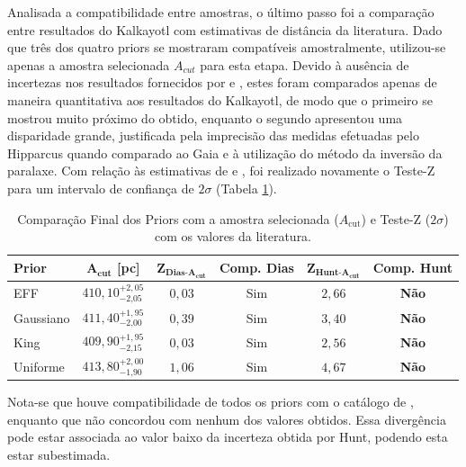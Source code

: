 \documentclass[12pt]{projeto}
\begin{document}
Analisada a compatibilidade entre amostras, o último passo foi a comparação entre resultados do Kalkayotl com estimativas de distância da literatura. Dado que três dos quatro priors se mostraram compatíveis amostralmente, utilizou-se apenas a amostra selecionada \(A_{cut}\) para esta etapa. Devido à ausência de incertezas nos resultados fornecidos por \cite{cantat-gaudin_painting_2020} e \cite{dias_new_2002}, estes foram comparados apenas de maneira quantitativa aos resultados do Kalkayotl, de modo que o primeiro se mostrou muito próximo do obtido, enquanto o segundo apresentou uma disparidade grande, justificada pela imprecisão das medidas efetuadas pelo Hipparcus quando comparado ao Gaia e à utilização do método da inversão da paralaxe. Com relação às estimativas de \cite{dias_updated_2021} e \cite{hunt_improving_2024}, foi realizado novamente o Teste-Z para um intervalo de confiança de \(2\sigma\) (Tabela \ref{tab:comparacao_final}).

\begin{table}[h]
    \centering
    \caption{Comparação Final dos Priors com a amostra selecionada ($A_{\text{cut}}$) e Teste-Z (\(2\sigma\)) com os valores da literatura.}
    \label{tab:comparacao_final}
    \renewcommand{\arraystretch}{1.5} %
    \begin{tabular}{|l|c|c|c|c|c|}
        \hline
        \textbf{Prior} & $\mathbf{A_{\text{cut}}}$ [pc] & $\mathbf{Z_{\text{Dias-A}_{\text{cut}}}}$ & \textbf{Comp. Dias} & $\mathbf{Z_{\text{Hunt-A}_{\text{cut}}}}$ & \textbf{Comp. Hunt} \\
        \hline
        EFF & $410,10^{+2,05}_{-\text{2,05}}$ & $0,03$ & Sim & $2,66$ & \textbf{Não} \\
        \hline
        Gaussiano & $411,40^{+1,95}_{-\text{2,00}}$ & $0,39$ & Sim & $3,40$ & \textbf{Não} \\
        \hline
        King & $409,90^{+1,95}_{-\text{2,15}}$ & $0,03$ & Sim & $2,56$ & \textbf{Não} \\
        \hline
        Uniforme & $413,80^{+2,00}_{-\text{1,90}}$ & $1,06$ & Sim & $4,67$ & \textbf{Não} \\
        \hline
    \end{tabular}
    \renewcommand{\arraystretch}{1.0} %
\end{table}

Nota-se que houve compatibilidade de todos os priors com o catálogo de \cite{dias_updated_2021}, enquanto que \cite{hunt_improving_2024} não concordou com nenhum dos valores obtidos. Essa divergência pode estar associada ao valor baixo da incerteza obtida por Hunt, podendo esta estar subestimada.
\end{document}
